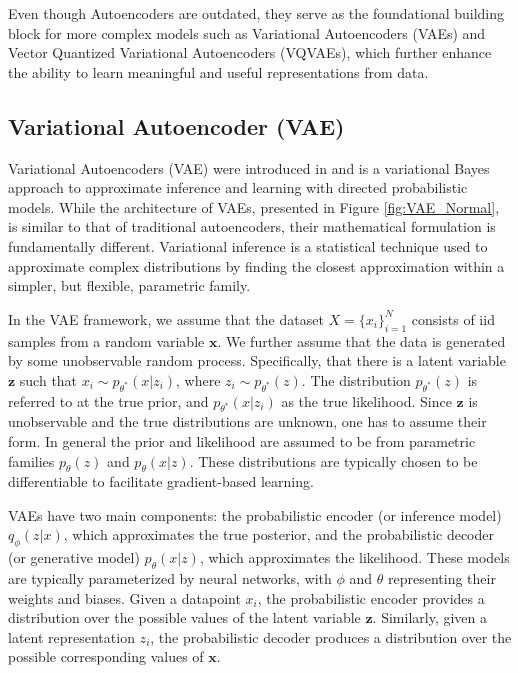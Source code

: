 \documentclass[../../thesis.tex]{subfiles}
\begin{document}
Even though Autoencoders are outdated, they serve as the foundational building block for more complex models such as Variational Autoencoders (VAEs) and Vector Quantized Variational Autoencoders (VQVAEs), which further enhance the ability to learn meaningful and useful representations from data.

\subsection{Variational Autoencoder (VAE)}
Variational Autoencoders (VAE) were introduced in \cite{kingma2022autoencoding} and is a variational Bayes approach to approximate inference and learning with directed probabilistic models. While the architecture of VAEs, presented in Figure \ref{fig:VAE_Normal}, is similar to that of traditional autoencoders, their mathematical formulation is fundamentally different. Variational inference is a statistical technique used to approximate complex distributions by finding the closest approximation within a simpler, but flexible, parametric family. \newline 

In the VAE framework, we assume that the dataset $X = \{x_i\}_{i=1}^{N}$ consists of iid samples from a random variable $\mathbf{x}$. We further assume that the data is generated by some unobservable random process. Specifically, that there is a latent variable $\mathbf{z}$ such that $x_i \sim p_{\theta^*}(x|z_i)$, where $z_i \sim p_{\theta^*}(z)$. The distribution $p_{\theta^*}(z)$ is referred to at the true prior, and $p_{\theta^*}(x|z_i)$ as the true likelihood. Since $\mathbf{z}$ is unobservable and the true distributions are unknown, one has to assume their form. In general the prior and likelihood are assumed to be from parametric families $p_{\theta}(z)$ and $p_{\theta}(x|z)$. These distributions are typically chosen to be differentiable to facilitate gradient-based learning.\newline

VAEs have two main components: the probabilistic encoder (or inference model) $q_\phi(z|x)$, which approximates the true posterior, and the probabilistic decoder (or generative model) $p_\theta(x|z)$, which approximates the likelihood. These models are typically parameterized by neural networks, with $\phi$ and $\theta$ representing their weights and biases. Given a datapoint $x_i$, the probabilistic encoder provides a distribution over the possible values of the latent variable $\mathbf{z}$. Similarly, given a latent representation $z_i$, the probabilistic decoder produces a distribution over the possible corresponding values of $\mathbf{x}$. \newline
\end{document}
